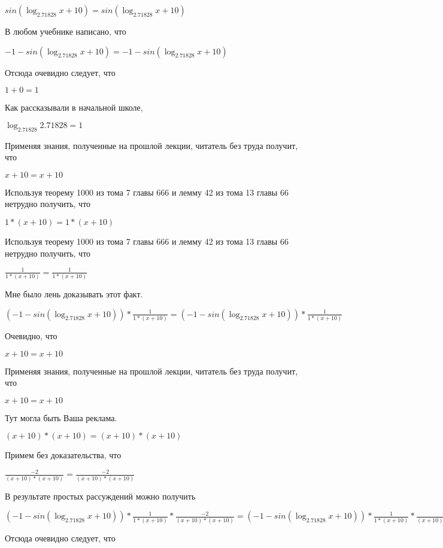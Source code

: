 \documentclass[12pt,a4paper,fleqn]{article}
\theoremstyle{definition}
\begin{document}
$sin(\log_{ 2.71828 }{ x  +  10 }) = sin(\log_{ 2.71828 }{ x  +  10 })$

В любом учебнике написано, что 

$ -1  - sin(\log_{ 2.71828 }{ x  +  10 }) =  -1  - sin(\log_{ 2.71828 }{ x  +  10 })$

Отсюда очевидно следует, что 

$ 1  +  0  =  1 $

Как рассказывали в начальной школе, 

$\log_{ 2.71828 }{ 2.71828 } =  1 $

Применяя знания, полученные на прошлой лекции, читатель без труда получит, что 

$ x  +  10  =  x  +  10 $

Используя теорему 1000 из тома 7 главы 666 и лемму 42 из тома 13 главы 66 нетрудно получить, что 

$ 1  * ( x  +  10 ) =  1  * ( x  +  10 )$

Используя теорему 1000 из тома 7 главы 666 и лемму 42 из тома 13 главы 66 нетрудно получить, что 

$\frac{ 1 }{ 1  * ( x  +  10 )}
 = \frac{ 1 }{ 1  * ( x  +  10 )}
$

Мне было лень доказывать этот факт.

$( -1  - sin(\log_{ 2.71828 }{ x  +  10 })) * \frac{ 1 }{ 1  * ( x  +  10 )}
 = ( -1  - sin(\log_{ 2.71828 }{ x  +  10 })) * \frac{ 1 }{ 1  * ( x  +  10 )}
$

Очевидно, что 

$ x  +  10  =  x  +  10 $

Применяя знания, полученные на прошлой лекции, читатель без труда получит, что 

$ x  +  10  =  x  +  10 $

Тут могла быть Ваша реклама. 

$( x  +  10 ) * ( x  +  10 ) = ( x  +  10 ) * ( x  +  10 )$

Примем без доказательства, что 

$\frac{ -2 }{( x  +  10 ) * ( x  +  10 )}
 = \frac{ -2 }{( x  +  10 ) * ( x  +  10 )}
$

В результате простых рассуждений можно получить 

$( -1  - sin(\log_{ 2.71828 }{ x  +  10 })) * \frac{ 1 }{ 1  * ( x  +  10 )}
 * \frac{ -2 }{( x  +  10 ) * ( x  +  10 )}
 = ( -1  - sin(\log_{ 2.71828 }{ x  +  10 })) * \frac{ 1 }{ 1  * ( x  +  10 )}
 * \frac{ -2 }{( x  +  10 ) * ( x  +  10 )}
$

Отсюда очевидно следует, что 
\end{document}
